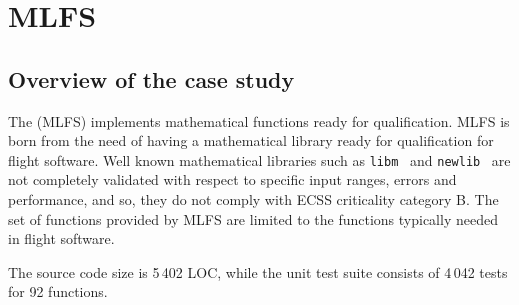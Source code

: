 \clearpage

\section{MLFS}
\label{sec:caseStudies:GSL:MLSF}

\subsection{Overview of the case study}

The  (MLFS) implements mathematical functions ready for qualification. 
MLFS is born from the need of having a mathematical library ready for qualification for flight software. Well known mathematical libraries such as \texttt{libm}~\cite{libm} and \texttt{newlib}~\cite{newlib} are not completely validated with respect to specific input ranges, errors and performance, and so, they do not comply with ECSS criticality category B.
The set of functions provided by MLFS are limited to the functions typically needed in flight software. 


The source code size is 5\,402 LOC, while the unit test suite consists of 4\,042 tests for 92 functions.

